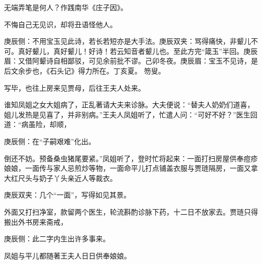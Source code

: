 \begin{poem}
    \begin{pl}无端弄笔是何人？作践南华《庄子因》。\end{pl}

    \begin{pl}不悔自己无见识，却将丑语怪他人。\end{pl}
    \begin{note}庚辰侧：不用宝玉见此诗，若长若短亦是大手法。庚辰双夹：骂得痛快，非颦儿不可。真好颦儿，真好颦儿！好诗！若云知音者颦儿也。至此方完“箴玉”半回。庚辰眉：又借阿颦诗自相鄙驳，可见余前批不谬。己卯冬夜。庚辰眉：宝玉不见诗，是后文余步也，《石头记》得力所在。丁亥夏。 笏叟。\end{note}
\end{poem}


\begin{parag}
    写毕，也往上房来见贾母，后往王夫人处来。
\end{parag}


\begin{parag}
    谁知凤姐之女大姐病了，正乱著请大夫来诊脉。大夫便说：“替夫人奶奶们道喜，姐儿发热是见喜了，并非别病。”王夫人凤姐听了，忙遣人问：“可好不好？”医生回道：“病虽险，却顺，\begin{note}庚辰侧：在“子嗣艰难”化出。\end{note}倒还不妨。预备桑虫猪尾要紧。”凤姐听了，登时忙将起来：一面打扫房屋供奉痘疹娘娘，一面传与家人忌煎炒等物，一面命平儿打点铺盖衣服与贾琏隔房，一面又拿大红尺头与奶子丫头亲近人等裁衣。\begin{note}庚辰双夹：几个“一面”，写得如见其景。\end{note}外面又打扫净室，款留两个医生，轮流斟酌诊脉下药，十二日不放家去。贾琏只得搬出外书房来斋戒，\begin{note}庚辰侧：此二字内生出许多事来。\end{note}凤姐与平儿都随著王夫人日日供奉娘娘。
\end{parag}


